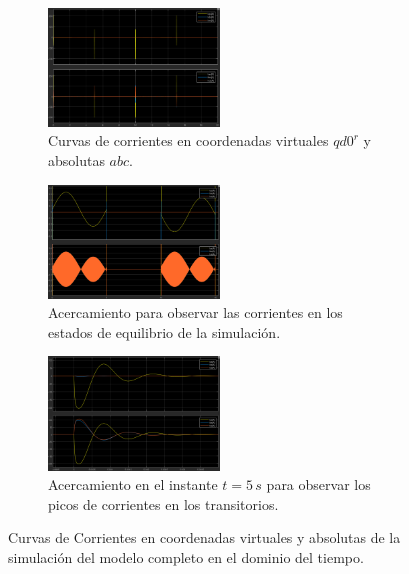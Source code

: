 \documentclass{article}
\begin{document}
\begin{figure}[H]
    \centering
    \begin{subfigure}[t]{\textwidth}
        \centering
        \includegraphics[width=0.5\textwidth]{Imagenes/CorrientesSimulacionCompleta.png}
        \caption{Curvas de corrientes en coordenadas virtuales \(qd0^r\) y absolutas \(abc\).}
        \label{fig:CorrientesSimulacionCompleta}
    \end{subfigure}
    
    \vspace{0.5cm} %
    
    \begin{subfigure}[t]{\textwidth}
        \centering
        \includegraphics[width=0.5\textwidth]{Imagenes/AcercamientoCorrientesEstacionariasSimulacion.png}
        \caption{Acercamiento para observar las corrientes en los estados de equilibrio de la simulación.}
        \label{fig:AcercamientoCorrientesEstacionariasSimulacion}
    \end{subfigure}

    \vspace{0.5cm} %
    
    \begin{subfigure}[t]{\textwidth}
        \centering
        \includegraphics[width=0.5\textwidth]{Imagenes/AcercamientoCorrientesTransitoriosSimulacion.png}
        \caption{Acercamiento en el instante \(t = 5\,s\) para observar los picos de corrientes en los transitorios.}
        \label{fig:AcercamientoCorrientesTransitoriosSimulacion}
    \end{subfigure}
    \caption{Curvas de Corrientes en coordenadas virtuales y absolutas de la simulación del modelo completo en el dominio del tiempo.}
    \label{fig:CorrientesSimulacionCompleta}
\end{figure}
\end{document}
